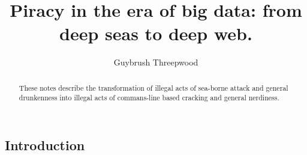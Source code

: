 \documentclass[a4paper,12pt,rmp,superscriptaddress]{revtex4}
\begin{document}
 

\title{Piracy in the era of big data: from deep seas to deep web.}

\author{Guybrush Threepwood}

%
%
%
%
\begin{abstract}
  These notes describe the transformation of illegal acts of sea-borne attack
  and general  drunkenness into illegal acts of commans-line based
  cracking and general nerdiness.  
\end{abstract}


\maketitle


\subsection*{Introduction} 

\end{document}
